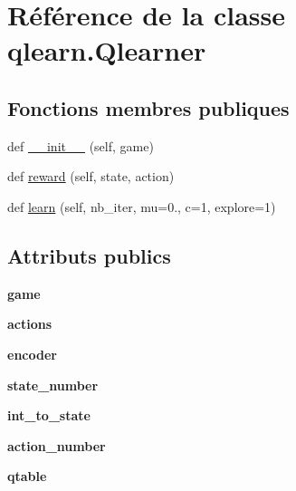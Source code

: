 \hypertarget{classqlearn_1_1Qlearner}{}\section{Référence de la classe qlearn.\+Qlearner}
\label{classqlearn_1_1Qlearner}
\subsection*{Fonctions membres publiques}
\begin{DoxyCompactItemize}
\item 
def \hyperlink{classqlearn_1_1Qlearner_a2358d27a7a8833adaf69138ceda4d7aa}{\+\_\+\+\_\+init\+\_\+\+\_\+} (self, game)
\item 
def \hyperlink{classqlearn_1_1Qlearner_aa5d2c9fb82ed55754cab3f485551ba22}{reward} (self, state, action)
\item 
def \hyperlink{classqlearn_1_1Qlearner_a21001f2c11418262b3b0cfc58fb91f72}{learn} (self, nb\+\_\+iter, mu=0., c=1, explore=1)
\end{DoxyCompactItemize}
\subsection*{Attributs publics}
\begin{DoxyCompactItemize}
\item 
\mbox{\label{classqlearn_1_1Qlearner_a69b12b006548c4ea15e63f5e22af8708}} 
{\bfseries game}
\item 
\mbox{\label{classqlearn_1_1Qlearner_a27bf7d240f5a715866a7dc249dd0bacb}} 
{\bfseries actions}
\item 
\mbox{\label{classqlearn_1_1Qlearner_a2eba21289650ffb2d6fd99ecfac97e63}} 
{\bfseries encoder}
\item 
\mbox{\label{classqlearn_1_1Qlearner_a8bbd7e43cb52617447d6ddb6b67aed79}} 
{\bfseries state\+\_\+number}
\item 
\mbox{\label{classqlearn_1_1Qlearner_ad83c3b921b20c82bd5e6aa3ac550b4a5}} 
{\bfseries int\+\_\+to\+\_\+state}
\item 
\mbox{\label{classqlearn_1_1Qlearner_a590de5eb34ceb094ad2ce575064a46c1}} 
{\bfseries action\+\_\+number}
\item 
\mbox{\label{classqlearn_1_1Qlearner_a85cd72fc90598ce1036f3bfbf1e19cc8}} 
{\bfseries qtable}
\end{DoxyCompactItemize}


